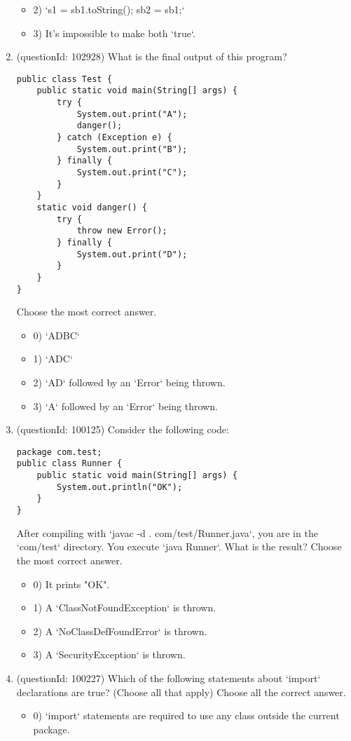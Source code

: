 \documentclass[12pt]{article}
\begin{document}
\begin{enumerate}[label=(\arabic*)]
\begin{itemize}
\item 2) `s1 = sb1.toString(); sb2 = sb1;`

\item 3) It's impossible to make both `true`.

\end{itemize}
\item (questionId: 102928) What is the final output of this program?
\begin{verbatim}
public class Test {
    public static void main(String[] args) {
        try {
            System.out.print("A");
            danger();
        } catch (Exception e) {
            System.out.print("B");
        } finally {
            System.out.print("C");
        }
    }
    static void danger() {
        try {
            throw new Error();
        } finally {
            System.out.print("D");
        }
    }
}
\end{verbatim}
Choose the most correct answer. 
\begin{itemize}
\item 0) `ADBC`

\item 1) `ADC`

\item 2) `AD` followed by an `Error` being thrown.

\item 3) `A` followed by an `Error` being thrown.

\end{itemize}
\item (questionId: 100125) Consider the following code:
\begin{verbatim}
package com.test;
public class Runner {
    public static void main(String[] args) {
        System.out.println("OK");
    }
}
\end{verbatim}
After compiling with `javac -d . com/test/Runner.java`, you are in the `com/test` directory. You execute `java Runner`. What is the result?
Choose the most correct answer. 
\begin{itemize}
\item 0) It prints "OK".

\item 1) A `ClassNotFoundException` is thrown.

\item 2) A `NoClassDefFoundError` is thrown.

\item 3) A `SecurityException` is thrown.

\end{itemize}
\item (questionId: 100227) Which of the following statements about `import` declarations are true? (Choose all that apply)
Choose all the correct answer.\begin{itemize}
\item 0) `import` statements are required to use any class outside the current package.


\end{itemize}
\end{enumerate}
\end{document}
